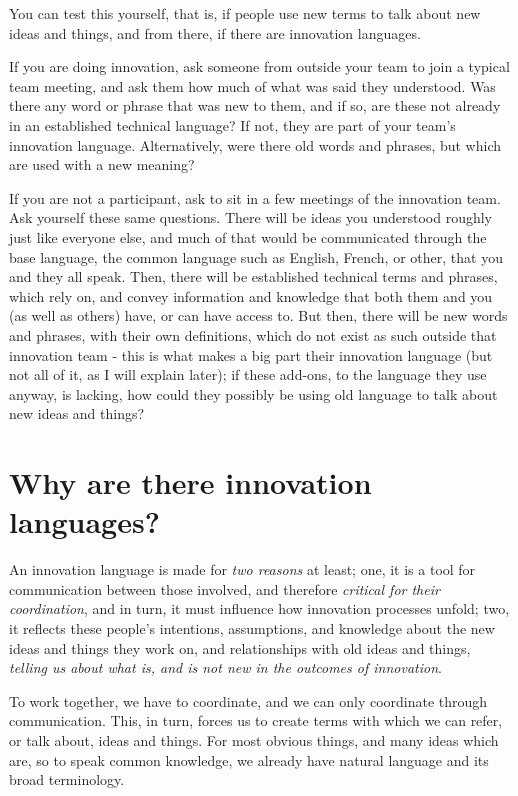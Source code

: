 You can test this yourself, that is, if people use new terms to talk about new ideas and things, and from there, if there are innovation languages. 

If you are doing innovation, ask someone from outside your team to join a typical team meeting, and ask them how much of what was said they understood. Was there any word or phrase that was new to them, and if so, are these not already in an established technical language? If not, they are part of your team's innovation language. Alternatively, were there old words and phrases, but which are used with a new meaning?

If you are not a participant, ask to sit in a few meetings of the innovation team. Ask yourself these same questions. There will be ideas you understood roughly just like everyone else, and much of that would be communicated through the base language, the common language such as English, French, or other, that you and they all speak. Then, there will be established technical terms and phrases, which rely on, and convey information and knowledge that both them and you (as well as others) have, or can have access to. But then, there will be new words and phrases, with their own definitions, which do not exist as such outside that innovation team - this is what makes a big part their innovation language (but not all of it, as I will explain later); if these add-ons, to the language they use anyway, is lacking, how could they possibly be using old language to talk about new ideas and things?

\section{Why are there innovation languages?}
\label{c1-s4}
An innovation language is made for \textit{two reasons} at least; one, it is a tool for communication between those involved, and therefore \textit{critical for their coordination}, and in turn, it must influence how innovation processes unfold; two, it reflects these people's intentions, assumptions, and knowledge about the new ideas and things they work on, and relationships with old ideas and things, \textit{telling us about what is, and is not new in the outcomes of innovation}.

To work together, we have to coordinate, and we can only coordinate through communication. This, in turn, forces us to create terms with which we can refer, or talk about, ideas and things. For most obvious things, and many ideas which are, so to speak common knowledge, we already have natural language and its broad terminology.

